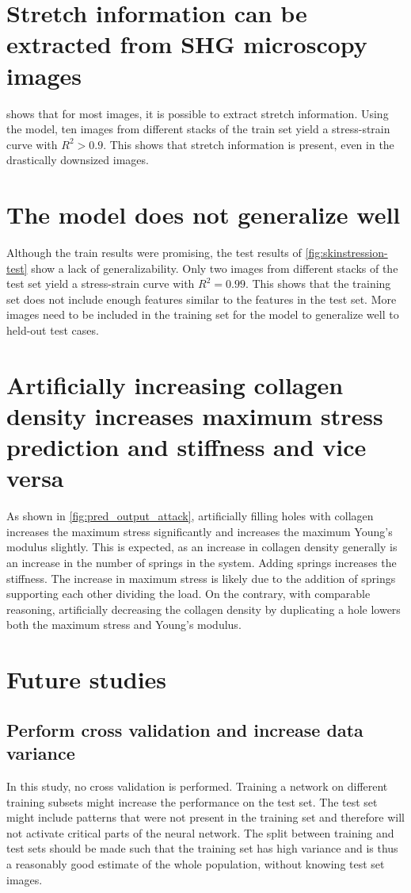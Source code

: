 \section{Stretch information can be extracted from SHG microscopy images}
 shows that for most images, it is possible to extract stretch information.
Using the model, ten images from different stacks of the train set yield a stress-strain curve with $R^2>0.9$.
This shows that stretch information is present, even in the drastically downsized images.

\section{The model does not generalize well}
Although the train results were promising, the test results of \cref{fig:skinstression-test} show a lack of generalizability.
Only two images from different stacks of the test set yield a stress-strain curve with $R^2=0.99$.
This shows that the training set does not include enough features similar to the features in the test set.
More images need to be included in the training set for the model to generalize well to held-out test cases.

\section{Artificially increasing collagen density increases maximum stress prediction and stiffness and vice versa}
As shown in \cref{fig:pred_output_attack}, artificially filling holes with collagen increases the maximum stress significantly and increases the maximum Young's modulus slightly.
This is expected, as an increase in collagen density generally is an increase in the number of springs in the system.
Adding springs increases the stiffness.
The increase in maximum stress is likely due to the addition of springs supporting each other dividing the load.
On the contrary, with comparable reasoning, artificially decreasing the collagen density by duplicating a hole lowers both the maximum stress and Young's modulus.

\section{Future studies}
\subsection{Perform cross validation and increase data variance}
In this study, no cross validation is performed.
Training a network on different training subsets might increase the performance on the test set.
The test set might include patterns that were not present in the training set and therefore will not activate critical parts of the neural network.
The split between training and test sets should be made such that the training set has high variance and is thus a reasonably good estimate of the whole population, without knowing test set images.

